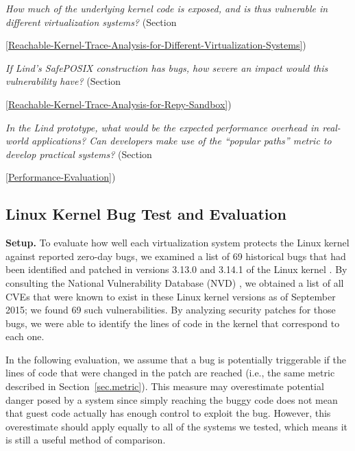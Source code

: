 \textit{How much of the underlying kernel code is exposed, and is thus
vulnerable in different virtualization systems?}
(Section~{{\ref{Reachable-Kernel-Trace-Analysis-for-Different-Virtualization-Systems}})

\textit{If Lind's SafePOSIX construction has bugs, how severe an impact would
this vulnerability have?}
(Section~{{\ref{Reachable-Kernel-Trace-Analysis-for-Repy-Sandbox}})

\textit{In the Lind prototype, what would be the expected performance overhead in
real-world applications? Can developers make use of the ``popular paths'' metric to develop
practical systems?}
(Section~{{\ref{Performance-Evaluation}})

\subsection{Linux Kernel Bug Test and Evaluation}
\label{Linux-Kernel-Bug-Test-and-Evaluation}


\noindent
\textbf{Setup.}
To evaluate how well each virtualization system protects the Linux kernel
against reported zero-day bugs,
we examined a list of 69 historical bugs that had been identified and patched in
versions 3.13.0 and 3.14.1 of the Linux kernel \cite{CVE-Datasource}.
By consulting the National Vulnerability Database (NVD) \cite{NVD}, we obtained
a list of all CVEs \cite{CVE} that were known to exist in these Linux kernel
versions as of September 2015; we found 69 such vulnerabilities.
By analyzing security patches for those bugs,
we were able to identify the lines of code in the kernel that correspond to each one.

In the following evaluation, we assume that a bug is potentially triggerable if the lines of code that were changed in the patch are reached
(i.e., the same metric described in Section~\ref{sec.metric}).
This measure may overestimate potential danger posed by a system since simply reaching the buggy code does not mean that guest code
actually has enough control to exploit the bug.
However, this overestimate should apply equally to all of the systems we tested, which means it is still a useful method of comparison.

}}}
